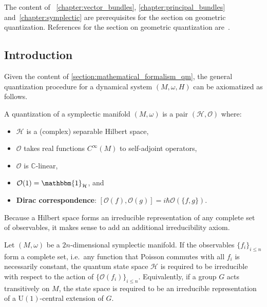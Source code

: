 \chapter{}\label{chapter:quantization}

    The content of ~\ref{chapter:vector_bundles}, \ref{chapter:principal_bundles} and~\ref{chapter:symplectic} are prerequisites for the section on geometric quantization. References for the section on geometric quantization are~\citet{brylinski_loop_1993,tuynman_metaplectic_2016}.

    \minitoc

\section{Introduction}

    Given the content of \cref{section:mathematical_formalism_qm}, the general quantization procedure for a dynamical system $(M,\omega,H)$ can be axiomatized as follows.
    \begin{method}\label{quantization:axioms}
        A quantization of a symplectic manifold $(M,\omega)$ is a pair $(\mathcal{H},\mathcal{O})$ where:
        \begin{itemize}
            \item $\mathcal{H}$ is a (complex) separable Hilbert space,
            \item $\mathcal{O}$ takes real functions $C^\infty(M)$ to self-adjoint operators,
            \item $\mathcal{O}$ is $\mathbb{C}$-linear,
            \item $\mathcal{O}(1) = \mathbbm{1}_{\mathcal{H}}$, and
            \item \textbf{Dirac correspondence}: $[\mathcal{O}(f),\mathcal{O}(g)] = i\hbar\mathcal{O}(\{f,g\})$.
        \end{itemize}
    \end{method}

    Because a Hilbert space forms an irreducible representation of any complete set of observables, it makes sense to add an additional irreducibility axiom.
    \begin{axiom}
        Let $(M,\omega)$ be a $2n$-dimensional symplectic manifold. If the observables $\{f_i\}_{i\leq n}$ form a complete set, i.e.~any function that Poisson commutes with all $f_i$ is necessarily constant, the quantum state space $\mathcal{H}$ is required to be irreducible with respect to the action of $\{\mathcal{O}(f_i)\}_{i\leq n}$. Equivalently, if a group $G$ acts transitively on $M$, the state space is required to be an irreducible representation of a $\mathrm{U}(1)$-central extension of $G$.
    \end{axiom}

